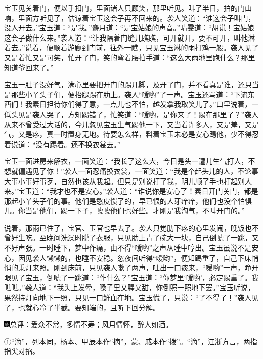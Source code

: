 宝玉见关着门，便以手扣门，里面诸人只顾笑，那里听见。叫了半日，拍的门山响，里面方听见了，估谅着宝玉这会子再不回来的。袭人笑道：``谁这会子叫门，没人开去。''宝玉道：``是我。''麝月道：``是宝姑娘的声音。''晴雯道：``胡说！宝姑娘这会子做什么来。''袭人道：``让我隔着门缝儿瞧瞧，可开就开，要不可开，叫他淋着去。''说着，便顺着游廊到门前，往外一瞧，只见宝玉淋的雨打鸡一般。袭人见了又是着忙又是可笑，忙开了门，笑的弯着腰拍手道：``这么大雨地里跑什么？那里知道爷回来了。''

宝玉一肚子没好气，满心里要把开门的踢几脚，及开了门，并不看真是谁，还只当是那些小丫头子们，便抬腿踢在肋上。袭人``嗳哟''了一声。宝玉还骂道：``下流东西们！我素日担待你们得了意，一点儿也不怕，越发拿我取笑儿了。''口里说着，一低头见是袭人哭了，方知踢错了，忙笑道：``嗳哟，是你来了！踢在那里了？''袭人从来不曾受过大话的，今儿忽见宝玉生气踢他一下，又当着许多人，又是羞，又是气，又是疼，真一时置身无地。待要怎么样，料着宝玉未必是安心踢他，少不得忍着说道：``没有踢着。还不换衣裳去。''

宝玉一面进房来解衣，一面笑道：``我长了这么大，今日是头一遭儿生气打人，不想就偏遇见了你！''袭人一面忍痛换衣裳，一面笑道：``我是个起头儿的人，不论事大事小事好事歹，自然也该从我起。但只是别说打了我，明儿顺了手也打起别人来。''宝玉道：``我才也不是安心。''袭人道：``谁说你是安心了！素日开门关门，都是那起小丫头子们的事。他们是憨皮惯了的，早已恨的人牙痒痒，他们也没个怕惧儿。你当是他们，踢一下子，唬唬他们也好些。才刚是我淘气，不叫开门的。''

说着，那雨已住了，宝官、玉官也早去了。袭人只觉肋下疼的心里发闹，晚饭也不曾好生吃。至晚间洗澡时脱了衣服，只见肋上青了碗大一块，自己倒唬了一跳，又不好声张。一时睡下，梦中作痛，由不得``嗳哟''之声从睡中哼出。宝玉虽说不是安心，因见袭人懒懒的，也睡不安稳。忽夜间听得``嗳哟''，便知踢重了，自己下床悄悄的秉灯来照。刚到床前，只见袭人嗽了两声，吐出一口痰来，``嗳哟''一声，睁开眼见了宝玉，倒唬了一跳道：``作什么？''宝玉道：``你梦里`嗳哟'，必定踢重了。我瞧瞧。''袭人道：``我头上发晕，嗓子里又腥又甜，你倒照一照地下罢。''宝玉听说，果然持灯向地下一照，只见一口鲜血在地。宝玉慌了，只说：``了不得了！''袭人见了，也就心冷了半截。要知端的，且听下回分解。

{\includegraphics[width=3mm]{../Images/00005}总评：爱众不常，多情不寿；风月情怀，醉人如酒。}

{\href{../Text/part0034_split_000.html\#navto_1_a}{①}``滴''，列本同，杨本、甲辰本作``摘''，蒙、戚本作``拨''。``滴''，江浙方言，两指指尖对掐。}
